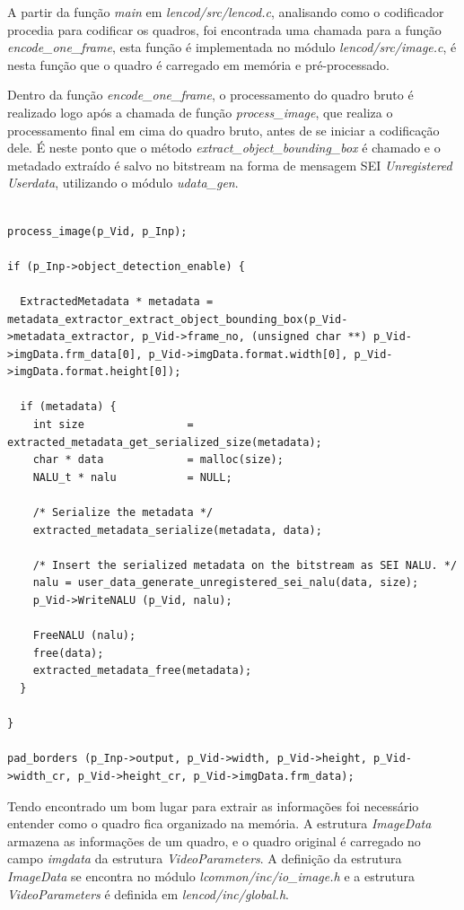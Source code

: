 A partir da função \textit{main} em \textit{lencod/src/lencod.c}, analisando como o codificador procedia para codificar os quadros, foi encontrada uma chamada para a função \textit{encode\_one\_frame}, esta função é implementada no módulo \textit{lencod/src/image.c}, é nesta função que o quadro é carregado em memória e pré-processado.

Dentro da função \textit{encode\_one\_frame}, o processamento do quadro bruto é realizado logo após a chamada de função \textit{process\_image}, que realiza o processamento final em cima do quadro bruto, antes de se iniciar a codificação dele. É neste ponto que o método \textit{extract\_object\_bounding\_box} é chamado e o metadado extraído é salvo no bitstream na forma de mensagem SEI \textit{Unregistered Userdata}, utilizando o módulo \textit{udata\_gen}.

\begin{lstlisting}

process_image(p_Vid, p_Inp);

if (p_Inp->object_detection_enable) {
    
  ExtractedMetadata * metadata = metadata_extractor_extract_object_bounding_box(p_Vid->metadata_extractor, p_Vid->frame_no, (unsigned char **) p_Vid->imgData.frm_data[0], p_Vid->imgData.format.width[0], p_Vid->imgData.format.height[0]);

  if (metadata) {
    int size                = extracted_metadata_get_serialized_size(metadata);
    char * data             = malloc(size);
    NALU_t * nalu           = NULL;
     
    /* Serialize the metadata */
    extracted_metadata_serialize(metadata, data);
      
    /* Insert the serialized metadata on the bitstream as SEI NALU. */
    nalu = user_data_generate_unregistered_sei_nalu(data, size);
    p_Vid->WriteNALU (p_Vid, nalu);

    FreeNALU (nalu);
    free(data);
    extracted_metadata_free(metadata);
  }

}

pad_borders (p_Inp->output, p_Vid->width, p_Vid->height, p_Vid->width_cr, p_Vid->height_cr, p_Vid->imgData.frm_data);

\end{lstlisting}

Tendo encontrado um bom lugar para extrair as informações foi necessário entender como o quadro fica organizado na memória. A estrutura \textit{ImageData} armazena as informações de um quadro, e o quadro original é carregado no campo \textit{imgdata} da estrutura \textit{VideoParameters}. A definição da estrutura \textit{ImageData} se encontra no módulo \textit{lcommon/inc/io\_image.h} e a estrutura \textit{VideoParameters} é definida em \textit{lencod/inc/global.h}.

